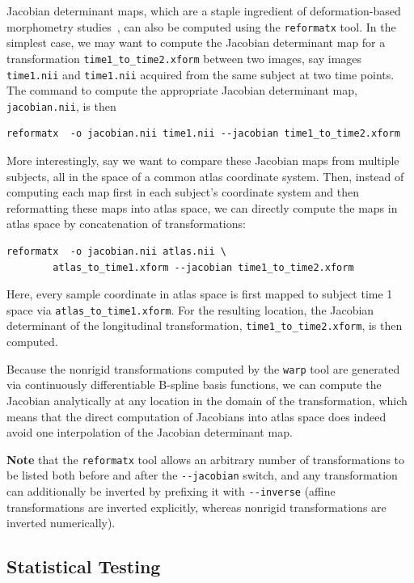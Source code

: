 \documentclass{InsightArticle}
\begin{document}
Jacobian determinant maps, which are a staple ingredient of deformation-based
morphometry studies~\cite{AshbHuttFrac:1998}, can also be computed using the
\verb|reformatx| tool. In the simplest case, we may want to compute the
Jacobian determinant map for a transformation \verb|time1_to_time2.xform|
between two images, say images \verb|time1.nii| and \verb|time1.nii| acquired
from the same subject at two time points. The command to compute the
appropriate Jacobian determinant map, \verb|jacobian.nii|, is then
\begin{verbatim}
reformatx  -o jacobian.nii time1.nii --jacobian time1_to_time2.xform
\end{verbatim}
More interestingly, say we want to compare these Jacobian maps from multiple
subjects, all in the space of a common atlas coordinate system. Then, instead
of computing each map first in each subject's coordinate system and then
reformatting these maps into atlas space, we can directly compute the maps in
atlas space by concatenation of transformations:
\begin{verbatim}
reformatx  -o jacobian.nii atlas.nii \
        atlas_to_time1.xform --jacobian time1_to_time2.xform
\end{verbatim}
Here, every sample coordinate in atlas space is first mapped to subject time 1
space via \verb|atlas_to_time1.xform|. For the resulting location, the
Jacobian determinant of the longitudinal transformation,
\verb|time1_to_time2.xform|, is then computed.

Because the nonrigid transformations computed by the \verb|warp| tool are
generated via continuously differentiable B-spline basis functions, we can
compute the Jacobian analytically at any location in the domain of the
transformation, which means that the direct computation of Jacobians into
atlas space does indeed avoid one interpolation of the Jacobian determinant
map.

{\bf Note} that the \verb|reformatx| tool allows an arbitrary number of
transformations to be listed both before and after the \verb|--jacobian|
switch, and any transformation can additionally be inverted by prefixing it
with \verb|--inverse| (affine transformations are inverted explicitly, whereas
nonrigid transformations are inverted numerically). 

\subsection{Statistical Testing}
\end{document}
